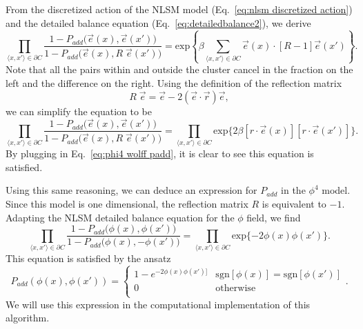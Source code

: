 \documentclass[12pt]{report}
\newcommand{\e}{\vec e}
\begin{document}
From the discretized action of the NLSM model (Eq.~\ref{eq:nlsm discretized action}) and the detailed balance equation (Eq.~\ref{eq:detailedbalance2}), we derive
\begin{equation}
    \prod_{\langle x,x'\rangle \in \partial C}  \frac{ 1 - P_{add}\big(\e(x),\e(x')\big)}{ 1 - P_{add}\big(\e(x),R\;\e(x')\big)}  = \mathrm{exp}\left\{\beta\sum_{\langle x,x'\rangle \in \partial C} \e(x)\cdot[R-1]\e(x')\right\}.
\end{equation}
Note that all the pairs within and outside the cluster cancel in the fraction on the left and the difference on the right. Using the definition of the reflection matrix
\begin{equation}
    R\;\e = \e - 2(\e\cdot\vec{r})\e,
\end{equation}
we can simplify the equation to be 
\begin{equation}
    \prod_{\langle x,x'\rangle \in \partial C}  \frac{ 1 - P_{add}\big(\e(x),\e(x')\big)}{ 1 - P_{add}\big(\e(x),R\;\e(x')\big)}  = \prod_{\langle x,x'\rangle \in \partial C}\mathrm{exp}\big\{2\beta[r\cdot\e(x)][r\cdot\e(x')]\big\}.
\end{equation}
By plugging in Eq.~\ref{eq:phi4 wolff padd}, it is clear to see this equation is satisfied.

Using this same reasoning, we can deduce an expression for $P_{add}$ in the $\phi^4$ model. Since this model is one dimensional, the reflection matrix $R$ is equivalent to $-1$. Adapting the NLSM detailed balance equation for the $\phi$ field, we find
\begin{equation}
    \prod_{\langle x,x'\rangle \in \partial C}  \frac{ 1 - P_{add}\big(\phi(x),\phi(x')\big)}{ 1 - P_{add}\big(\phi(x),-\phi(x')\big)}  = \prod_{\langle x,x'\rangle \in \partial C}\mathrm{exp}\{-2 \phi(x)\phi(x')\}.
\end{equation}
This equation is satisfied by the ansatz
\begin{equation}
    \label{eq:nlsm wolff padd}
    P_{add}(\phi(x),\phi(x')) = \begin{cases} 
        1 - e^{-2\phi(x)\phi(x')]} & \mathrm{sgn}[\phi(x)]=\mathrm{sgn}[\phi(x')]\\
        0 & \mathrm{otherwise} \\
   \end{cases}.
\end{equation}
We will use this expression in the computational implementation of this algorithm.
\end{document}
